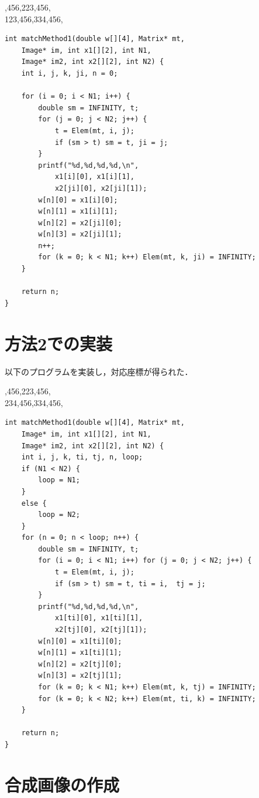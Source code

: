 \documentclass[11pt]{jarticle}
\begin{document}
,456,223,456,\\
123,456,334,456,\\

\begin{lstlisting}
int matchMethod1(double w[][4], Matrix* mt,
    Image* im, int x1[][2], int N1,
    Image* im2, int x2[][2], int N2) {
    int i, j, k, ji, n = 0;

    for (i = 0; i < N1; i++) {
        double sm = INFINITY, t;
        for (j = 0; j < N2; j++) {
            t = Elem(mt, i, j);
            if (sm > t) sm = t, ji = j;
        }
        printf("%d,%d,%d,%d,\n",
            x1[i][0], x1[i][1],
            x2[ji][0], x2[ji][1]);
        w[n][0] = x1[i][0];
        w[n][1] = x1[i][1];
        w[n][2] = x2[ji][0];
        w[n][3] = x2[ji][1];
        n++;
        for (k = 0; k < N1; k++) Elem(mt, k, ji) = INFINITY;
    }

    return n;
}
\end{lstlisting}

\section{方法2での実装}

以下のプログラムを実装し，対応座標が得られた．

,456,223,456,\\
234,456,334,456,\\

\begin{lstlisting}
int matchMethod1(double w[][4], Matrix* mt,
    Image* im, int x1[][2], int N1,
    Image* im2, int x2[][2], int N2) {
    int i, j, k, ti, tj, n, loop;
    if (N1 < N2) {
        loop = N1;
    }
    else {
        loop = N2;
    }
    for (n = 0; n < loop; n++) {
        double sm = INFINITY, t;
        for (i = 0; i < N1; i++) for (j = 0; j < N2; j++) {
            t = Elem(mt, i, j);
            if (sm > t) sm = t, ti = i,  tj = j;
        }
        printf("%d,%d,%d,%d,\n",
            x1[ti][0], x1[ti][1],
            x2[tj][0], x2[tj][1]);
        w[n][0] = x1[ti][0];
        w[n][1] = x1[ti][1];
        w[n][2] = x2[tj][0];
        w[n][3] = x2[tj][1];
        for (k = 0; k < N1; k++) Elem(mt, k, tj) = INFINITY;
        for (k = 0; k < N2; k++) Elem(mt, ti, k) = INFINITY;
    }

    return n;
}
\end{lstlisting}

\section{合成画像の作成}
\end{document}
